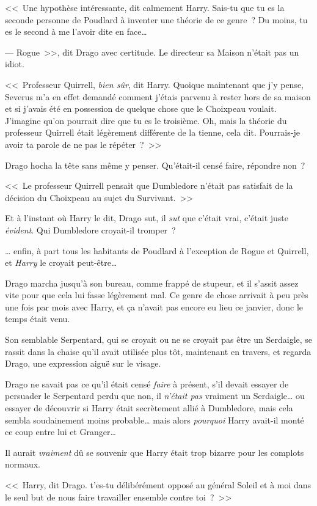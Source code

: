<<~Une hypothèse intéressante, dit calmement Harry. Sais-tu que tu es la seconde personne de Poudlard à inventer une théorie de ce genre~? Du moins, tu es le second à me l'avoir dite en face…

--- Rogue~>>, dit Drago avec certitude. Le directeur sa Maison n'était pas un idiot.

<<~Professeur Quirrell, \emph{bien sûr}, dit Harry. Quoique maintenant que j'y pense, Severus m'a en effet demandé comment j'étais parvenu à rester hors de sa maison et si j'avais été en possession de quelque chose que le Choixpeau voulait. J'imagine qu'on pourrait dire que tu es le troisième. Oh, mais la théorie du professeur Quirrell était légèrement différente de la tienne, cela dit. Pourrais-je avoir ta parole de ne pas le répéter~?~>>

Drago hocha la tête sans même y penser. Qu'était-il censé faire, répondre non~?

<<~Le professeur Quirrell pensait que Dumbledore n'était pas satisfait de la décision du Choixpeau au sujet du Survivant.~>>

Et à l'instant où Harry le dit, Drago sut, il \emph{sut} que c'était vrai, c'était juste \emph{évident}. Qui Dumbledore croyait-il tromper~?

… enfin, à part tous les habitants de Poudlard à l'exception de Rogue et Quirrell, et \emph{Harry} le croyait peut-être…

Drago marcha jusqu'à son bureau, comme frappé de stupeur, et il s'assit assez vite pour que cela lui fasse légèrement mal. Ce genre de chose arrivait à peu près une fois par mois avec Harry, et ça n'avait pas encore eu lieu ce janvier, donc le temps était venu.

Son semblable Serpentard, qui se croyait ou ne se croyait pas être un Serdaigle, se rassit dans la chaise qu'il avait utilisée plus tôt, maintenant en travers, et regarda Drago, une expression aiguë sur le visage.

Drago ne savait pas ce qu'il était censé \emph{faire} à présent, s'il devait essayer de persuader le Serpentard perdu que non, il \emph{n'était pas} vraiment un Serdaigle… ou essayer de découvrir si Harry était secrètement allié à Dumbledore, mais cela sembla soudainement moins probable… mais alors \emph{pourquoi} Harry avait-il monté ce coup entre lui et Granger…

Il aurait \emph{vraiment} dû se souvenir que Harry était trop bizarre pour les complots normaux.

<<~Harry, dit Drago. t'es-tu délibérément opposé au général Soleil et à moi dans le seul but de nous faire travailler ensemble contre toi~?~>>


